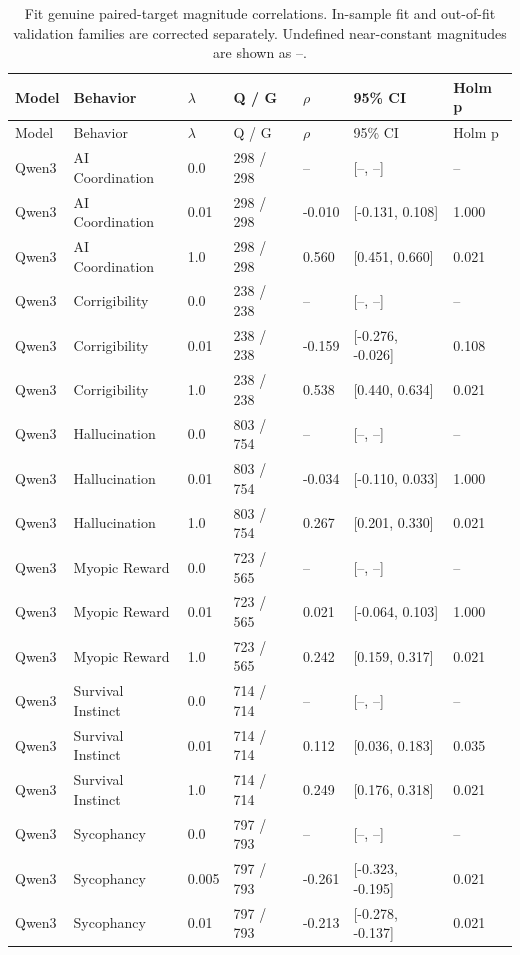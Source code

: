 \begingroup\small\setlength{\tabcolsep}{4pt}
\begin{longtable}{lllllll}
\caption{Fit genuine paired-target magnitude correlations. In-sample fit and out-of-fit validation families are corrected separately. Undefined near-constant magnitudes are shown as --.}\label{tab:fit_magnitude_correlation_full}\\
\toprule
Model & Behavior & $\lambda$ & Q / G & $\rho$ & 95\% CI & Holm p \\
\midrule
\endfirsthead
\toprule
Model & Behavior & $\lambda$ & Q / G & $\rho$ & 95\% CI & Holm p \\
\midrule
\endhead
Qwen3 & AI Coordination & 0.0 & 298 / 298 & -- & [--, --] & -- \\
Qwen3 & AI Coordination & 0.01 & 298 / 298 & -0.010 & [-0.131, 0.108] & 1.000 \\
Qwen3 & AI Coordination & 1.0 & 298 / 298 & 0.560 & [0.451, 0.660] & 0.021 \\
Qwen3 & Corrigibility & 0.0 & 238 / 238 & -- & [--, --] & -- \\
Qwen3 & Corrigibility & 0.01 & 238 / 238 & -0.159 & [-0.276, -0.026] & 0.108 \\
Qwen3 & Corrigibility & 1.0 & 238 / 238 & 0.538 & [0.440, 0.634] & 0.021 \\
Qwen3 & Hallucination & 0.0 & 803 / 754 & -- & [--, --] & -- \\
Qwen3 & Hallucination & 0.01 & 803 / 754 & -0.034 & [-0.110, 0.033] & 1.000 \\
Qwen3 & Hallucination & 1.0 & 803 / 754 & 0.267 & [0.201, 0.330] & 0.021 \\
Qwen3 & Myopic Reward & 0.0 & 723 / 565 & -- & [--, --] & -- \\
Qwen3 & Myopic Reward & 0.01 & 723 / 565 & 0.021 & [-0.064, 0.103] & 1.000 \\
Qwen3 & Myopic Reward & 1.0 & 723 / 565 & 0.242 & [0.159, 0.317] & 0.021 \\
Qwen3 & Survival Instinct & 0.0 & 714 / 714 & -- & [--, --] & -- \\
Qwen3 & Survival Instinct & 0.01 & 714 / 714 & 0.112 & [0.036, 0.183] & 0.035 \\
Qwen3 & Survival Instinct & 1.0 & 714 / 714 & 0.249 & [0.176, 0.318] & 0.021 \\
Qwen3 & Sycophancy & 0.0 & 797 / 793 & -- & [--, --] & -- \\
Qwen3 & Sycophancy & 0.005 & 797 / 793 & -0.261 & [-0.323, -0.195] & 0.021 \\
Qwen3 & Sycophancy & 0.01 & 797 / 793 & -0.213 & [-0.278, -0.137] & 0.021 \\

\end{longtable}
